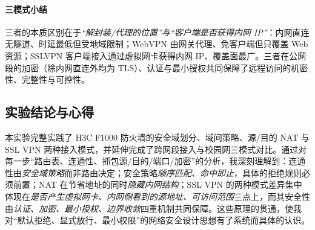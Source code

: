 \documentclass[12pt,a4paper]{article}
\begin{document}
\paragraph{三模式小结}三者的本质区别在于\emph{“解封装/代理的位置”与“客户端是否获得内网 IP”}：内网直连无隧道、时延最低但受地域限制；WebVPN 由网关代理、免客户端但只覆盖 Web 资源；SSLVPN 客户端接入通过虚拟网卡获得内网 IP、覆盖面最广。三者在公网段的加密（除内网直连外均为 TLS）、认证与最小授权共同保障了远程访问的机密性、完整性与可控性。

\subsection*{实验结论与心得}
本实验完整实践了 H3C F1000 防火墙的安全域划分、域间策略、源/目的 NAT 与 SSL VPN 两种接入模式，并延伸完成了跨网段接入与校园网三模式对比。通过对每一步“路由表、连通性、抓包源/目的/端口/加密”的分析，我深刻理解到：连通性由\emph{安全域策略}而非路由决定；安全策略\emph{顺序匹配、命中即止}，具体的拒绝规则必须前置；NAT 在节省地址的同时\emph{隐藏内网结构}；SSL VPN 的两种模式差异集中体现在\emph{是否产生虚拟网卡、内网侧看到的源地址、可访问范围}三点上，而其安全性由\emph{认证、加密、最小授权、边界收敛}四重机制共同保障。这些原理的贯通，使我对“默认拒绝、显式放行、最小权限”的网络安全设计思想有了系统而具体的认识。
\end{document}
